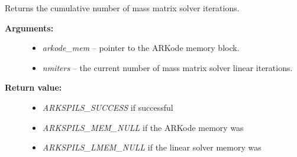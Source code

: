 \documentclass[letterpaper,10pt,english]{sphinxmanual}
\begin{document}
\begin{fulllineitems}
\label{c_interface/User_callable:c.ARKSpilsGetNumMassIters}
Returns the cumulative number of mass matrix solver iterations.
\begin{description}
\item[{\textbf{Arguments:}}] \leavevmode\begin{itemize}
\item {} 
\emph{arkode\_mem} -- pointer to the ARKode memory block.

\item {} 
\emph{nmiters} -- the current number of mass matrix solver linear iterations.

\end{itemize}

\item[{\textbf{Return value:}}] \leavevmode\begin{itemize}
\item {} 
\emph{ARKSPILS\_SUCCESS} if successful

\item {} 
\emph{ARKSPILS\_MEM\_NULL} if the ARKode memory was 

\item {} 
\emph{ARKSPILS\_LMEM\_NULL} if the linear solver memory was 

\end{itemize}

\end{description}

\end{fulllineitems}

\end{document}
